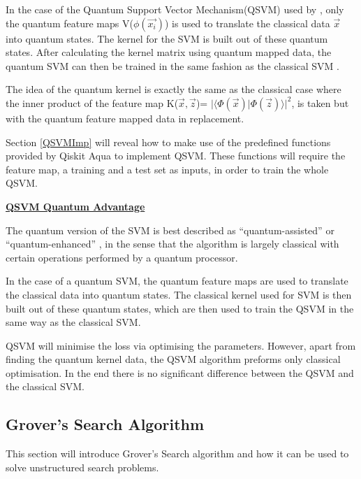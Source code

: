 In the case of  the Quantum Support Vector Mechanism(QSVM) used by \emph{\citep{mcrae2020}}, only the quantum feature maps V($\phi(\overrightarrow{x_i})$) is used to translate the classical data $\overrightarrow{x}$ into quantum states. The kernel for the SVM is built out of these quantum states. After calculating the kernel matrix using quantum mapped data, the quantum SVM can then be trained in the same fashion as the classical SVM \citep{svm}.


The idea of the quantum kernel is exactly the same as the classical case where the inner product of the feature map K($\overrightarrow{x}, \overrightarrow{z}$)= $\vert\langle\Phi(\overrightarrow{x})\vert\Phi(\overrightarrow{z})\rangle\vert^2$, is taken but with the quantum feature mapped data in replacement.%


Section \ref{QSVMImp} will reveal how to make use of the predefined functions provided by Qiskit Aqua to implement QSVM. These functions will require the feature map, a training and a test set as inputs, in order to train the whole QSVM.

\vspace{0.4cm}
\textbf{\underline{QSVM Quantum Advantage }}

The quantum version of the SVM is best described as “quantum-assisted” or “quantum-enhanced” \citep{Back7}, in the sense that the algorithm is largely classical with certain operations performed by a quantum processor.

In the case of a quantum SVM, the quantum feature maps are used to translate the classical data into quantum states. The classical kernel used for SVM is then built out of these quantum states, which are then used to train the QSVM in the same way as the classical SVM.

QSVM will minimise the loss via optimising the parameters. However, apart from finding the quantum kernel data, the QSVM algorithm preforms only classical optimisation. In the end there is no significant difference between the QSVM and the classical SVM.


\subsection{Grover's Search Algorithm }\label{GrovImp}
This section will introduce Grover's Search algorithm and how it can be used to solve unstructured search problems.


